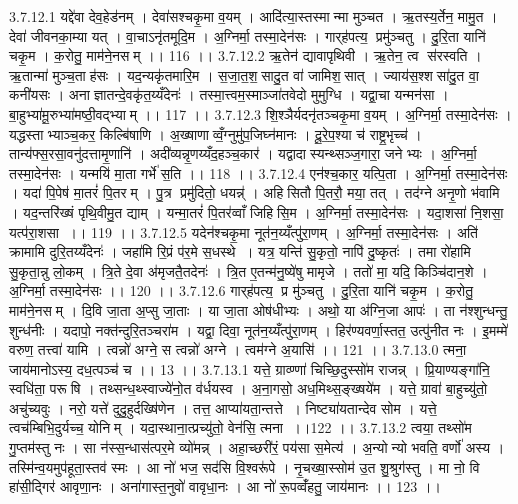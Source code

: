 3.7.12.1
यद्दे॑वा देव॒हेड॑नम् । देवा॑सश्चकृ॒मा व॒यम् । आदि॑त्या॒स्तस्मान्मा मुञ्चत । ऋ॒तस्य॒र्तेन॒ मामु॒त । देवा॑ जीवनका॒म्या यत् । वा॒चाऽनृ॑तमूदि॒म । अ॒ग्निर्मा॒ तस्मा॒देन॑सः । गार्‌ह॑पत्य॒ प्रमु॑ञ्चतु । दु॒रि॒ता यानि॑ चकृ॒म । क॒रोतु॒ माम॑ने॒नसम् ।। 116 ।।
3.7.12.2
ऋ॒तेन॑ द्यावापृथिवी । ऋ॒तेन॒ त्व स॑रस्वति । ऋ॒तान्मा॑ मुञ्च॒ताह॑सः । यद॒न्यकृ॑तमारि॒म । स॒जा॒त॒श॒॒सादु॒त वा॑ जामिश॒॒सात् । ज्याय॑स॒श्शसा॑दु॒त वा॒ कनी॑यसः । अनाज्ञातन्दे॒वकृ॑त॒य्यँदेनः॑ । तस्मा॒त्त्वम॒स्माञ्जा॑तवेदो मुमुग्धि । यद्वा॒चा यन्मन॑सा । बा॒हुभ्या॑मू॒रुभ्या॑मष्ठी॒वद्भ्याम् ।। 117 ।।
3.7.12.3
शि॒श्ञैर्यदनृ॑तञ्चकृ॒मा व॒यम् । अ॒ग्निर्मा॒ तस्मा॒देन॑सः । यद्धस्ताभ्याञ्च॒कर॒ किल्बि॑षाणि । अ॒ख्षाणाव्वँ॒ग्नुमु॑प॒जिघ्न॑मानः । दू॒रे॒प॒श्या च॑ राष्ट्र॒भृच्च॑ । तान्य॑फ्स॒रसा॒वनु॑दत्तामृ॒णानि॑ । अदी॑व्यन्नृ॒णय्यँद॒हञ्च॒कार॑ । यद्वादास्यन्थ्सञ्ज॒गारा॒ जनेभ्यः । अ॒ग्निर्मा॒ तस्मा॒देन॑सः । यन्मयि॑ मा॒ता गर्भे॑ स॒ति ।। 118 ।।
3.7.12.4
एन॑श्च॒कार॒ यत्पि॒ता । अ॒ग्निर्मा॒ तस्मा॒देन॑सः । यदा॑ पि॒पेष॑ मा॒तरं॑ पि॒तरम् । पु॒त्र प्रमु॑दितो॒ धयन्न्॑ । अहि॑सितौ पि॒तरौ॒ मया॒ तत् । तद॑ग्ने अनृ॒णो भ॑वामि । यद॒न्तरि॑ख्षं पृथि॒वीमु॒त द्याम् । यन्मा॒तरं॑ पि॒तर॑व्वाँ जिहिसि॒म । अ॒ग्निर्मा॒ तस्मा॒देन॑सः । यदा॒शसा॑ नि॒शसा॒ यत्प॑रा॒शसा ।। 119 ।।
3.7.12.5
यदेन॑श्चकृ॒मा नूत॑न॒य्यँत्पु॑रा॒णम् । अ॒ग्निर्मा॒ तस्मा॒देन॑सः । अति॑ क्रामामि दुरि॒तय्यँदेनः॑ । जहा॑मि रि॒प्रं प॑र॒मे स॒धस्थे । यत्र॒ यन्ति॑ सु॒कृतो॒ नापि॑ दु॒ष्कृतः॑ । तमा रो॑हामि सु॒कृता॒न्नु लो॒कम् । त्रि॒ते दे॒वा अ॑मृजतै॒तदेनः॑ । त्रि॒त ए॒तन्म॑नु॒ष्ये॑षु मामृजे । ततो॑ मा॒ यदि॒ किञ्चि॑दान॒शे । अ॒ग्निर्मा॒ तस्मा॒देन॑सः ।। 120 ।।
3.7.12.6
गार्‌ह॑पत्य॒ प्र मु॑ञ्चतु । दु॒रि॒ता यानि॑ चकृ॒म । क॒रोतु॒ माम॑ने॒नसम् । दि॒वि जा॒ता अ॒प्सु जा॒ताः । या जा॒ता ओष॑धीभ्यः । अथो॒ या अ॑ग्नि॒जा आपः॑ । ता न॑श्शुन्धन्तु॒ शुन्ध॑नीः । यदापो॒ नक्त॑न्दुरि॒तञ्चरा॑म । यद्वा॒ दिवा॒ नूत॑न॒य्यँत्पु॑रा॒णम् । हिर॑ण्यवर्णा॒स्तत॒ उत्पु॑नीत नः । इ॒मम्मे॑ वरुण॒ तत्त्वा॑ यामि । त्वन्नो॑ अग्ने॒ स त्वन्नो॑ अग्ने । त्वम॑ग्ने अ॒यासि॑ ।। 121 ।।
3.7.13.0
त्मना॒ जाय॑मानोऽस्य॒ दध॒त्पञ्च॑ च ।। 13 ।।
3.7.13.1
यत्ते॒ ग्राव्ण्णा॑ चिच्छि॒दुस्सो॑म राजन्न् । प्रि॒याण्यङ्गा॑नि॒ स्वधि॑ता॒ परू॑षि । तथ्सन्ध॒थ्स्वाज्ये॑नो॒त व॑र्धयस्व । अ॒ना॒गसो॒ अध॒मिथ्स॒ङ्ख्षये॑म । यत्ते॒ ग्रावा॑ बा॒हुच्यु॑तो॒ अचु॑च्यवुः । नरो॒ यत्ते॑ दुदु॒हुर्दख्षि॑णेन । तत्त॒ आप्या॑यता॒न्तत्ते । निष्ट्या॑यतान्देव सोम । यत्ते॒ त्वच॑म्बिभि॒दुर्यच्च॒ योनिम् । यदा॒स्थाना॒त्प्रच्यु॑तो॒ वेन॑सि॒ त्मना ।।122 ।।
3.7.13.2
त्वया॒ तथ्सो॑म गु॒प्तम॑स्तु नः । सा न॑स्स॒न्धास॑त्पर॒मे व्यो॑मन्न् । अहा॒च्छरी॑रं॒ पय॑सा स॒मेत्य॑ । अ॒न्योन्यो भवति॒ वर्णो॑ अस्य । तस्मि॑न्व॒यमुप॑हूता॒स्तव॑ स्मः । आ नो॑ भज॒ सद॑सि वि॒श्वरू॑पे । नृ॒चख्षा॒स्सोम॑ उ॒त शु॒श्रुग॑स्तु । मा नो॒ वि हा॑सी॒द्गिर॑ आवृणा॒नः । अना॑गास्त॒नुवो॑ वावृधा॒नः । आ नो॑ रू॒पव्वँ॑हतु॒ जाय॑मानः ।। 123 ।।
